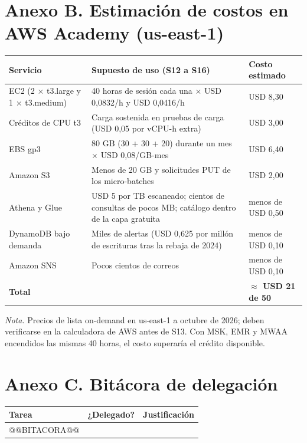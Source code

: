 \documentclass[12pt,letterpaper]{article}
\begin{document}
\section*{Anexo B. Estimación de costos en AWS Academy (us-east-1)}
\begin{footnotesize}
\begin{tabular}{@{}P{1.55in}P{3.3in}P{1.45in}@{}}
\toprule
\textbf{Servicio} & \textbf{Supuesto de uso (S12 a S16)} & \textbf{Costo estimado}\\
\midrule
EC2 (2 $\times$ t3.large y 1 $\times$ t3.medium) & 40 horas de sesión cada una $\times$ USD 0,0832/h y USD 0,0416/h & USD 8,30\\
Créditos de CPU t3 & Carga sostenida en pruebas de carga (USD 0,05 por vCPU-h extra) & USD 3,00\\
EBS gp3 & 80 GB (30 + 30 + 20) durante un mes $\times$ USD 0,08/GB-mes & USD 6,40\\
Amazon S3 & Menos de 20 GB y solicitudes PUT de los micro-batches & USD 2,00\\
Athena y Glue & USD 5 por TB escaneado; cientos de consultas de pocos MB; catálogo dentro de la capa gratuita & menos de USD 0,50\\
DynamoDB bajo demanda & Miles de alertas (USD 0,625 por millón de escrituras tras la rebaja de 2024) & menos de USD 0,10\\
Amazon SNS & Pocos cientos de correos & menos de USD 0,10\\
\midrule
\textbf{Total} & & \textbf{$\approx$ USD 21 de 50}\\
\bottomrule
\end{tabular}

\vspace{3pt}
\noindent\emph{Nota.} Precios de lista on-demand en us-east-1 a octubre de 2026; deben verificarse en la calculadora de AWS antes de S13. Con MSK, EMR y MWAA encendidos las mismas 40 horas, el costo superaría el crédito disponible.
\end{footnotesize}

\section*{Anexo C. Bitácora de delegación}
\begin{footnotesize}
\begin{tabular}{@{}P{2.2in}P{0.85in}P{3.25in}@{}}
\toprule
\textbf{Tarea} & \textbf{¿Delegado?} & \textbf{Justificación}\\
\midrule
@@BITACORA@@
\bottomrule
\end{tabular}
\end{footnotesize}
\end{document}
